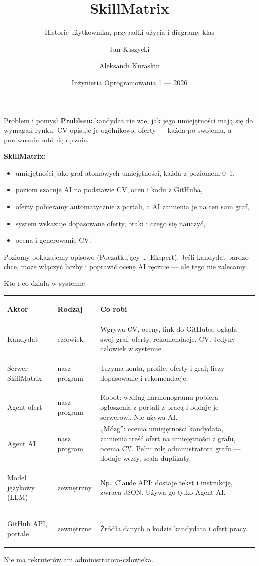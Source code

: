 \documentclass[aspectratio=169,10pt]{beamer}
\title{SkillMatrix}
\subtitle{Historie użytkownika, przypadki użycia i diagramy klas}
\author{Jan Kaszycki \and Aleksandr Kuraskin}
\date{Inżynieria Oprogramowania 1 --- 2026}
\begin{document}
\begin{frame}
  \titlepage
\end{frame}

\begin{frame}{Problem i pomysł}
  \textbf{Problem:} kandydat nie wie, jak jego umiejętności mają się do wymagań rynku.
  CV opisuje je ogólnikowo, oferty --- każda po swojemu, a porównanie robi się ręcznie.

  \bigskip
  \textbf{SkillMatrix:}
  \begin{itemize}
    \item umiejętności jako \alert{graf atomowych umiejętności}, każda z poziomem 0--1,
    \item poziom szacuje \alert{AI} na podstawie CV, ocen i kodu z GitHuba,
    \item oferty \alert{pobieramy automatycznie z portali}, a AI zamienia je na ten sam graf,
    \item system wskazuje dopasowane oferty, braki i \alert{czego się nauczyć},
    \item ocena i generowanie CV.
  \end{itemize}

  \bigskip
  Poziomy pokazujemy opisowo (Początkujący \dots\ Ekspert). Jeśli kandydat bardzo chce,
  może włączyć liczby i poprawić ocenę AI ręcznie --- ale tego nie zalecamy.
\end{frame}

\begin{frame}{Kto i co działa w systemie}
  \small
  \begin{tabularx}{\textwidth}{@{}>{\bfseries\raggedright\arraybackslash}p{3.1cm} p{2.3cm} L@{}}
    \toprule
    Aktor & Rodzaj & Co robi \\
    \midrule
    Kandydat & człowiek & Wgrywa CV, oceny, link do GitHuba; ogląda swój graf, oferty, rekomendacje, CV. Jedyny człowiek w systemie. \\
    Serwer SkillMatrix & nasz program & Trzyma konta, profile, oferty i graf; liczy dopasowanie i rekomendacje. \\
    Agent ofert & nasz program & Robot: według harmonogramu pobiera ogłoszenia z portali z pracą i oddaje je serwerowi. Nie używa AI. \\
    Agent AI & nasz program & „Mózg”: ocenia umiejętności kandydata, zamienia treść ofert na umiejętności z grafu, ocenia CV. \alert{Pełni rolę administratora grafu} --- dodaje węzły, scala duplikaty. \\
    Model językowy (LLM) & zewnętrzny & Np.\ Claude API: dostaje tekst i instrukcję, zwraca JSON. Używa go tylko Agent AI. \\
    GitHub API, portale & zewnętrzne & Źródła danych o kodzie kandydata i ofert pracy. \\
    \bottomrule
  \end{tabularx}

  \medskip
  Nie ma rekruterów ani administratora-człowieka.
\end{frame}
\end{document}
